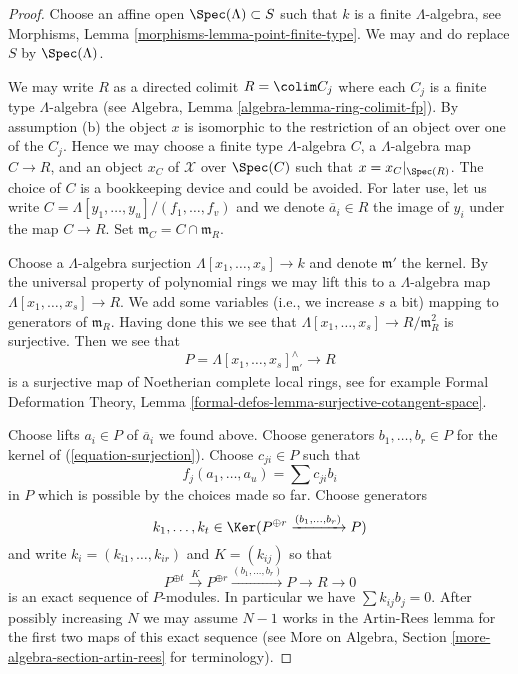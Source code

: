 \begin{proof}
Choose an affine open $\Spec(\Lambda) \subset S$ such that $k$ is a finite
$\Lambda$-algebra, see
Morphisms, Lemma \ref{morphisms-lemma-point-finite-type}.
We may and do replace $S$ by $\Spec(\Lambda)$.

\medskip\noindent
We may write $R$ as a directed colimit $R = \colim C_j$ where each
$C_j$ is a finite type $\Lambda$-algebra (see
Algebra, Lemma \ref{algebra-lemma-ring-colimit-fp}).
By assumption (b) the object $x$ is isomorphic to the restriction of
an object over one of the $C_j$. Hence we may choose a finite type
$\Lambda$-algebra $C$, a $\Lambda$-algebra map $C \to R$, and an object
$x_C$ of $\mathcal{X}$ over $\Spec(C)$ such that $x = x_C|_{\Spec(R)}$.
The choice of $C$ is a bookkeeping device and could be avoided.
For later use, let us write $C = \Lambda[y_1, \ldots, y_u]/(f_1, \ldots, f_v)$
and we denote $\overline{a}_i \in R$ the image of $y_i$ under the
map $C \to R$. Set $\mathfrak m_C = C \cap \mathfrak m_R$.

\medskip\noindent
Choose a $\Lambda$-algebra surjection $\Lambda[x_1, \ldots, x_s] \to k$
and denote $\mathfrak m'$ the kernel.
By the universal property of polynomial rings we may lift this
to a $\Lambda$-algebra map $\Lambda[x_1, \ldots, x_s] \to R$.
We add some variables (i.e., we increase $s$ a bit) mapping to generators
of $\mathfrak m_R$. Having done this we see that
$\Lambda[x_1, \ldots, x_s] \to R/\mathfrak m_R^2$ is surjective.
Then we see that
\begin{equation}
\label{equation-surjection}
P = \Lambda[x_1, \ldots, x_s]_{\mathfrak m'}^\wedge \longrightarrow R
\end{equation}
is a surjective map of Noetherian complete local rings, see for example
Formal Deformation Theory, Lemma
\ref{formal-defos-lemma-surjective-cotangent-space}.

\medskip\noindent
Choose lifts $a_i \in P$ of $\overline{a}_i$ we found above.
Choose generators $b_1, \ldots, b_r \in P$ for the kernel of
(\ref{equation-surjection}).
Choose $c_{ji} \in P$ such that
$$
f_j(a_1, \ldots, a_u) = \sum c_{ji} b_i
$$
in $P$ which is possible by the choices made so far. Choose generators
$$
k_1, \ldots, k_t \in
\Ker(P^{\oplus r} \xrightarrow{(b_1, \ldots, b_r)} P)
$$
and write $k_i = (k_{i1}, \ldots, k_{ir})$ and $K = (k_{ij})$
so that
$$
P^{\oplus t} \xrightarrow{K}
P^{\oplus r} \xrightarrow{(b_1, \ldots, b_r)}
P \to R \to 0
$$
is an exact sequence of $P$-modules. In particular we have
$\sum k_{ij} b_j = 0$. After possibly increasing $N$ we may
assume $N - 1$ works in the Artin-Rees lemma for the first two maps of this
exact sequence (see More on Algebra, Section
\ref{more-algebra-section-artin-rees} for terminology).


\end{proof}
